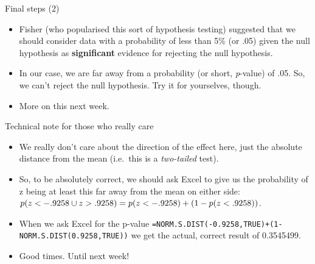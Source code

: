 \begin{frame}{Final steps (2)}

\begin{itemize}
\itemsep1pt\parskip0pt
\item
  Fisher (who popularised this sort of hypothesis testing) suggested
  that we should consider data with a probability of less than 5\% (or
  .05) given the null hypothesis as \textbf{significant} evidence for
  rejecting the null hypothesis.
\item
  In our case, we are far away from a probability (or short,
  \emph{p}-value) of .05. So, we can't reject the null hypothesis. Try
  it for yourselves, though.
\item
  More on this next week.
\end{itemize}

\end{frame}

\begin{frame}{Technical note for those who really care}

\begin{itemize}
\itemsep1pt\parskip0pt
\item
  We really don't care about the direction of the effect here, just the
  absolute distance from the mean (i.e.~this is a \emph{two-tailed}
  test).
\item
  So, to be absolutely correct, we should ask Excel to give us the
  probability of z being at least this far away from the mean on either
  side:
  \(p(z < -.9258 \cup z > .9258) \\= p(z < -.9258) + (1-p(z < .9258))\).
\item
  When we ask Excel for the p-value
  \texttt{=NORM.S.DIST(-0.9258,TRUE)+(1-NORM.S.DIST(0.9258,TRUE))} we
  get the actual, correct result of 0.3545499.
\item
  Good times. Until next week!
\end{itemize}

\end{frame}
